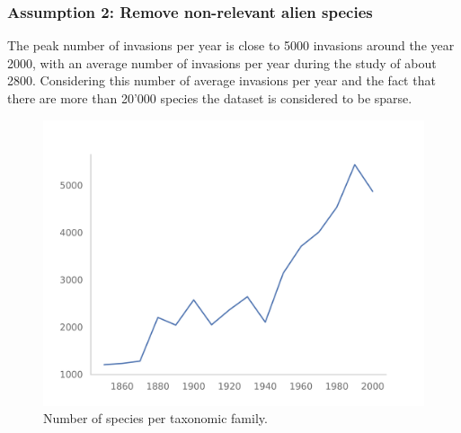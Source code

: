 \documentclass[
	11pt, %
]{beamer}
\begin{document}
\begin{frame}
\frametitle{Assumption 2: Remove non-relevant alien species}
	The peak number of invasions per year is close to 5000 invasions around the year 2000, with an average number of invasions per year during the study of about 2800. Considering this number of average invasions per year and the fact that there are more than 20’000 species the dataset is considered to be sparse.

\begin{figure}
\includegraphics[width=0.5\linewidth]{invasion_per_year}
		\caption{Number of species per taxonomic family.}
	\end{figure}

\end{frame}
\end{document}
